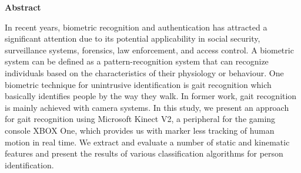 \begin{center}
\begin{huge}
\bfseries{Abstract}
\end{huge}
\end{center}

\noindent {} In recent years, biometric recognition and authentication has attracted a significant attention due to its potential applicability in social security, surveillance systems, forensics, law enforcement, and access control. A biometric system can be defined as a pattern-recognition system that can recognize individuals based on the characteristics of their physiology or behaviour. One biometric technique for unintrusive identification is gait recognition which basically identifies people by the way they walk. In former work, gait recognition is mainly achieved with camera systems. In this study, we present an approach for gait recognition using Microsoft Kinect V2, a peripheral for the gaming console XBOX One, which provides us with marker less tracking of human motion in real time. We extract and evaluate a number of static and kinematic features and present the results of various classification algorithms for person identification.
\pagebreak
